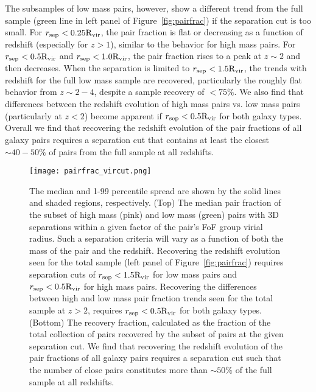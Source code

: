 \documentclass[linenumbers,twocolumn]{aastex631}
\newcommand{\Rvir}{\ensuremath{\rm R_{vir}}}
\begin{document}
    The subsamples of low mass pairs, however, show a different trend from the full sample (green line in left panel of Figure~\ref{fig:pairfrac}) if the separation cut is too small. 
    For $r_{\mathrm{sep}} < 0.25\Rvir$, the pair fraction is flat or decreasing as a function of redshift (especially for $z>1$), similar to the behavior for high mass pairs. 
    For $r_{\mathrm{sep}} < 0.5\Rvir$ and $r_{\mathrm{sep}} < 1.0\Rvir$, the pair fraction rises to a peak at $z\sim2$ and then decreases. 
    When the separation is limited to $r_{\mathrm{sep}} < 1.5\Rvir$, the trends with redshift for the full low mass sample are recovered, particularly the roughly flat behavior from $z\sim2-4$, despite a sample recovery of $<75\%$. 
    We also find that differences between the redshift evolution of high mass pairs vs. low mass pairs (particularly at $z<2$) become apparent if $r_{\mathrm{sep}} < 0.5\Rvir$ for both galaxy types. 
    Overall we find that recovering the redshift evolution of the pair fractions of all galaxy pairs requires a separation cut that contains at least the closest $\sim40-50\%$ of pairs from the full sample at all redshifts. 

    \begin{figure*}[htp]
        \centering
        \texttt{[image: pairfrac\_vircut.png]}
        \caption{\label{fig:vircut}The median and 1-99 percentile spread are shown by the solid lines and shaded regions, respectively. 
        (Top) The median pair fraction of the subset of high mass (pink) and low mass (green) pairs with 3D separations within a given factor of the pair's FoF group virial radius.
        Such a separation criteria will vary as a function of both the mass of the pair and the redshift. 
        Recovering the redshift evolution seen for the total sample (left panel of Figure~\ref{fig:pairfrac}) requires separation cuts of $r_{\mathrm{sep}} < 1.5\Rvir$ for low mass pairs and $r_{\mathrm{sep}} < 0.5\Rvir$ for high mass pairs. 
        Recovering the differences between high and low mass pair fraction trends seen for the total sample at $z>2$, requires $r_{\mathrm{sep}} < 0.5\Rvir$ for both galaxy types. 
        (Bottom) The recovery fraction, calculated as the fraction of the total collection of pairs recovered by the subset of pairs at the given separation cut. 
        We find that recovering the redshift evolution of the pair fractions of all galaxy pairs requires a separation cut such that the number of close pairs constitutes more than $\sim50\%$ of the full sample at all redshifts.
    }
    \end{figure*}
\end{document}
